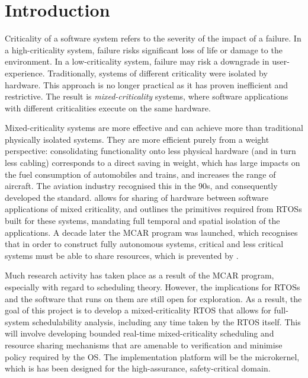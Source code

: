 \chapter{Introduction}


Criticality of a software system refers to the severity of the impact of a failure. 
In a high-criticality system, failure risks significant loss of life or damage to the environment.
In a low-criticality system, failure may risk a downgrade in user-experience.
Traditionally, systems of different criticality were isolated by hardware.
This approach is no longer practical as it has proven inefficient and restrictive.
The result is \emph{mixed-criticality} systems, where software applications with different criticalities execute on the same hardware.

Mixed-criticality systems are more effective and can achieve more than traditional physically isolated systems.
They are more efficient purely from a weight perspective: consolidating functionality onto less physical hardware (and in turn less cabling) corresponds to a direct saving in weight, which has large impacts on the fuel consumption of automobiles and trains, and increases the range of aircraft.
The aviation industry recognised this in the 90s, and consequently developed the \citet{ARINC653} standard.
\citet{ARINC653} allows for sharing of hardware between software applications of mixed criticality, and outlines the primitives required from \glspl{RTOS} built for these systems, mandating full temporal and spatial isolation of the applications.
A decade later the \gls{MCAR}\citep{Barhorst_BBHPSSSSU_09} program was launched, which recognises that in order to construct fully autonomous systems, critical and less critical systems must be able to share resources, which is prevented by \citet{ARINC653}.

Much research activity has taken place as a result of the \gls{MCAR} program, especially with regard to scheduling theory.
However, the implications for \glspl{RTOS} and the software that runs on them are still open for exploration.
As a result, the goal of this project is to develop a mixed-criticality \gls{RTOS} that allows for full-system schedulability analysis, including any time taken by the \gls{RTOS} itself.
This will involve developing bounded real-time mixed-criticality scheduling and resource sharing mechanisms that are amenable to verification and minimise policy required by the OS.
The implementation platform will be the \selfour microkernel, which is has been designed for the high-assurance, safety-critical domain.

